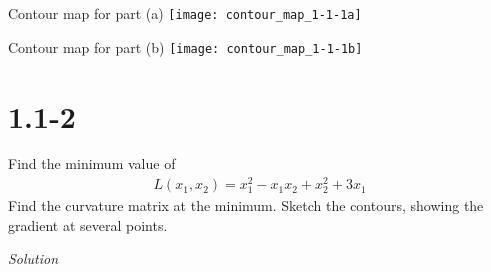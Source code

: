 \documentclass{article}
\begin{document}
  Contour map for part (a) \newline
  \texttt{[image: contour\_map\_1-1-1a]}
  
  Contour map for part (b) \newline
  \texttt{[image: contour\_map\_1-1-1b]}
  
  \newpage

  \section{1.1-2}

  Find the minimum value of 
  \begin{align*}
    L(x_1, x_2) = x_1^2 - x_1x_2 + x_2^2 + 3x_1 \tag{2.1}
  \end{align*}
  Find the curvature matrix at the minimum. Sketch the contours, showing the gradient at 
  several points. \newline \newline

  \noindent \textit{Solution}
\end{document}

